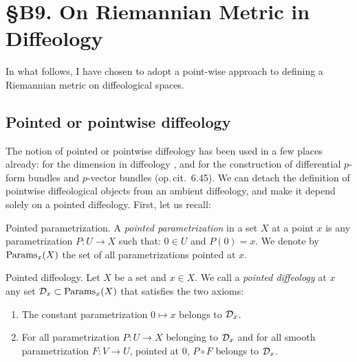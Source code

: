 
\chapter*{\S B9. On Riemannian Metric in Diffeology}
\setcounter{footnote}{0}

\begin{abstract}
  In this note,
  we attempt to establish the formal framework of Riemannian diffeology.
  This involves providing a definition of a Riemannian metric that coincides with the standard definition on manifolds.
  It is easy to define a symmetric,
  covariant positive 2-tensor;
  the tricky part is deciding what we mean by positive definite.
\end{abstract}

In what follows,
I have chosen to adopt a point-wise approach to defining a Riemannian metric on diffeological spaces.

\section{Pointed or pointwise diffeology}

The notion of pointed or pointwise diffeology has been used in a few places already:
for the dimension in diffeology \cite[\textsection\,2.19/20]{PIZ13},
and for the construction of differential $p$-form bundles and $p$-vector bundles (op.\,cit. \textsection\,6.45).
We can detach the definition of pointwise diffeological objects from an ambient diffeology,
and make it depend solely on a pointed diffeology.
First,
let us recall:

\begin{Article}{Pointed parametrization.}{}
  A \emph{pointed parametrization} in a set $X$ at a point $x$ is any parametrization $P :U \to X$ such that:
  $0 \in U$ and $P(0)=x$.
  We denote by $\mathrm{Params}_x(X)$ the set of all parametrizations pointed at $x$.
\end{Article}

\begin{Article}{Pointed diffeology.}{}
  Let $X$ be a set and $x \in X$.
  We call a \emph{pointed diffeology} at $x$ any set $\mathcal{D}_x \subset \mathrm{Params}_x(X)$ that satisfies the two axioms:
  
  \begin{enumerate}
    \item The constant parametrization $0 \mapsto x$ belongs to $\mathcal{D}_x$.
    \item For all parametrization $P : U \to X$ belonging to $\mathcal{D}_x$ and for all smooth parametrization $F : V \to U$,
    pointed at $0$,
    $P \circ F$ belongs to $\mathcal{D}_x$.
  \end{enumerate}
\end{Article}


